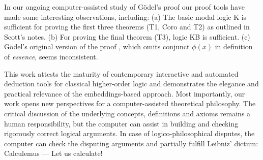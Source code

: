 \documentclass{llncs}
\begin{document}
In our ongoing computer-assisted study of G\"odel's proof our proof
tools have made
some interesting observations, including:
(a) The basic modal logic K is sufficient for proving the first three
theorems (T1, Coro and T2) as outlined in Scott's notes.
(b)  For proving the final theorem (T3), logic KB is
  sufficient.
(c) G\"odel's original  version of the proof \cite{GoedelNotes}, which omits
conjunct $\phi(x)$ in definition of \textit{essence}, seems inconsistent.

This work attests the maturity of contemporary interactive and
automated deduction tools for classical higher-order logic and
demonstrates the elegance and practical relevance of the
embeddings-based approach.  Most importantly, our work opens new
perspectives for a computer-assisted theoretical philosophy.  The
critical discussion of the underlying concepts, definitions and axioms
remains a human responsibility, but the computer can assist in
building and checking rigorously correct logical arguments. In case of
logico-philosophical disputes, the computer can check the disputing
arguments and partially fulfill Leibniz' dictum: Calculemus --- Let us
calculate!

\small
\end{document}
